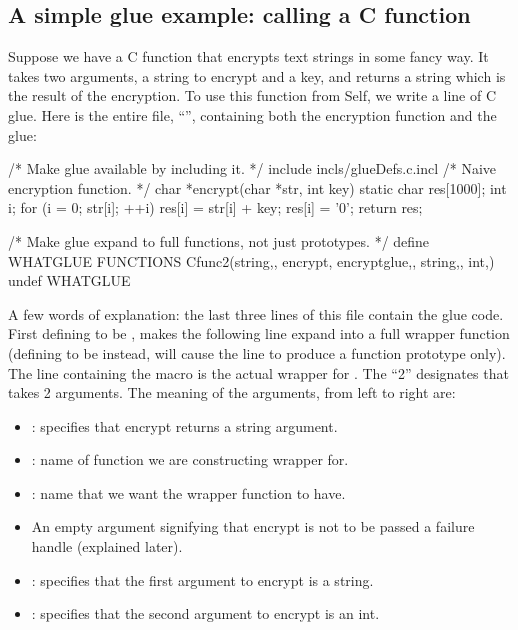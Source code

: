 \documentclass[letterpaper,10pt,english]{sphinxmanual}
\begin{document}

\subsection{A simple glue example: calling a C function}
\label{\detokenize{vmref:index-66}}\label{\detokenize{vmref:a-simple-glue-example-calling-a-c-function}}
Suppose we have a C function that encrypts text strings in some fancy way. It takes two arguments,
a string to encrypt and a key, and returns a string which is the result of the encryption. To use this
function from Self, we write a line of C glue. Here is the entire file, “”, containing both
the encryption function and the glue:

\begin{sphinxVerbatim}[commandchars=\\\{\}]
/* Make glue available by including it. */
\PYGZsh{} include \PYGZdq{}incls/\PYGZus{}glueDefs.c.incl\PYGZdq{}
/* Naive encryption function. */
char *encrypt(char *str, int key) \PYGZob{}
    static char res[1000];
    int i;
    for (i = 0; str[i]; ++i)
        res[i] = str[i] + key;
    res[i] = ’\PYGZbs{}0’;
    return res;
\PYGZcb{}

/* Make glue expand to full functions, not just prototypes. */
\PYGZsh{} define WHAT\PYGZus{}GLUE FUNCTIONS
    C\PYGZus{}func\PYGZus{}2(string,, encrypt, encrypt\PYGZus{}glue,, string,, int,)
\PYGZsh{} undef WHAT\PYGZus{}GLUE
\end{sphinxVerbatim}

A few words of explanation: the last three lines of this file contain the glue code. First defining
 to be , makes the following line expand into a full wrapper function (defining
 to be  instead, will cause the  line to produce a function
prototype only). The line containing the macro  is the actual wrapper for .
The “2” designates that  takes 2 arguments. The meaning of the arguments, from left to
right are:
\begin{itemize}
\item {} 
: specifies that encrypt returns a string argument.

\item {} 
: name of function we are constructing wrapper for.

\item {} 
: name that we want the wrapper function to have.

\item {} 
An empty argument signifying that encrypt is not to be passed a failure handle (explained later).

\item {} 
: specifies that the first argument to encrypt is a string.

\item {} 
: specifies that the second argument to encrypt is an int.

\end{itemize}
\end{document}
